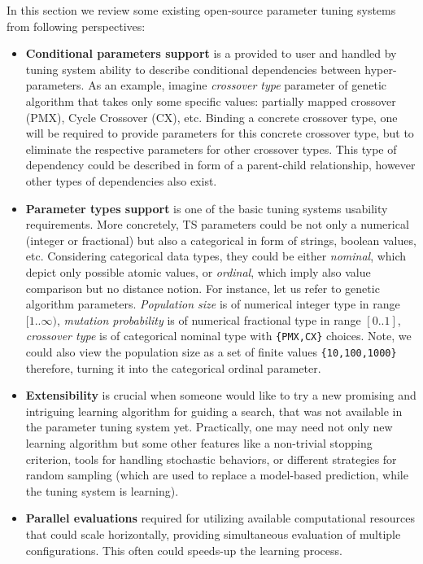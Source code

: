In this section we review some existing open-source parameter tuning systems from following perspectives:
\begin{itemize}
	\item \textbf{Conditional parameters support} is a provided to user and handled by tuning system ability to describe conditional dependencies between hyper-parameters. As an example, imagine \emph{crossover type} parameter of genetic algorithm that takes only some specific values: partially mapped crossover (PMX), Cycle Crossover (CX), etc. Binding a concrete crossover type, one will be required to provide parameters for this concrete crossover type, but to eliminate the respective parameters for other crossover types. This type of dependency could be described in form of a parent-child relationship, however other types of dependencies also exist.
	
	\item \textbf{Parameter types support} is one of the basic tuning systems usability requirements. More concretely, TS parameters could be not only a numerical (integer or fractional) but also a categorical in form of strings, boolean values, etc. Considering categorical data types, they could be either \emph{nominal}, which depict only possible atomic values, or \emph{ordinal}, which imply also value comparison but no distance notion. For instance, let us refer to genetic algorithm parameters. \emph{Population size} is of numerical integer type in range $[1..\infty)$, \emph{mutation probability} is of numerical fractional type in range $[0..1]$, \emph{crossover type} is of categorical nominal type with \texttt{\{PMX,CX\}} choices. Note, we could also view the population size as a set of finite values \texttt{\{10,100,1000\}} therefore, turning it into the categorical ordinal parameter.
	
	\item \textbf{Extensibility} is crucial when someone would like to try a new promising and intriguing learning algorithm for guiding a search, that was not available in the parameter tuning system yet. Practically, one may need not only new learning algorithm but some other features like a non-trivial stopping criterion, tools for handling stochastic behaviors, or different strategies for random sampling (which are used to replace a model-based prediction, while the tuning system is learning).
	
	\item \textbf{Parallel evaluations} required for utilizing available computational resources that could scale horizontally, providing simultaneous evaluation of multiple configurations. This often could speeds-up the learning process.
\end{itemize}

